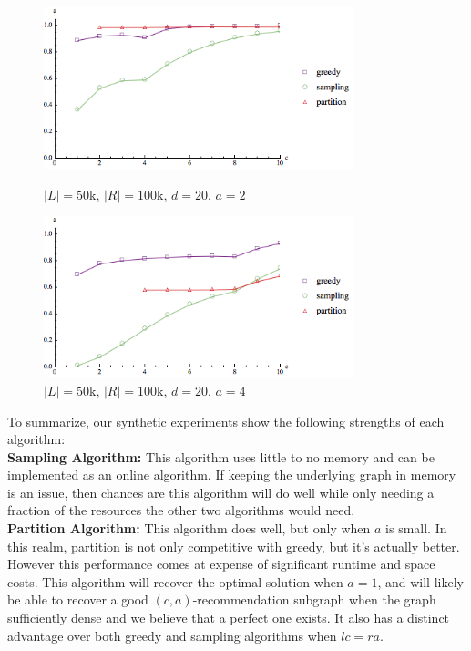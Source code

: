 \begin{figure}[t]
\centering
\begin{minipage}[h]{0.48\textwidth}
\centering
\includegraphics[width=0.8\textwidth]{images/l=50000,r=100000,a=2_Greedy_vs_Naive.png}
\caption{$|L|=50$k, $|R|=100$k, $d=20$, $a=2$}\label{fig:a=2}
\end{minipage}
\hspace{0cm}
\begin{minipage}[h]{0.48\textwidth}
\centering
\includegraphics[width=0.8\textwidth]{images/l=50000,r=100000,a=4_Greedy_vs_Naive.png}
\caption{$|L|=50$k, $|R|=100$k, $d=20$, $a=4$}\label{fig:a=4}
\end{minipage}
\vspace{-0.2in}
\end{figure}

\vs
To summarize, our synthetic experiments show the following strengths of each algorithm:\\

\textbf{Sampling Algorithm:} This algorithm uses little to no memory and can
be implemented as an online algorithm. If keeping the underlying graph in
memory is an issue, then chances are this algorithm will do well while only needing
a fraction of the resources the other two algorithms would need.\\

\textbf{Partition Algorithm:} This algorithm does well, but only when $a$ is small. In this
realm, partition is not only competitive with greedy, but it's actually better. However
this performance comes at expense of significant runtime and space costs. This algorithm
will recover the  optimal solution when $a=1$, and will likely be able to recover a
good $(c,a)$-recommendation subgraph when the graph sufficiently dense and we believe that a perfect one exists. It also has
a distinct advantage over both greedy and sampling algorithms when $lc=ra$. \\

